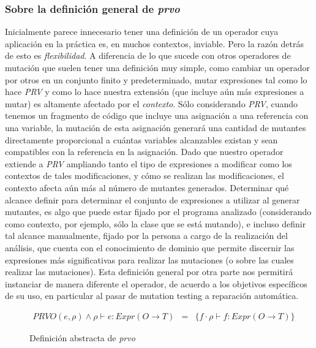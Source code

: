 \subsubsection{Sobre la definici\'on general de \emph{prvo}}
Inicialmente parece innecesario tener una definici\'on de un operador cuya aplicaci\'on en la pr\'actica es, en muchos contextos, inviable. Pero la raz\'on detr\'as de esto es \emph{flexibilidad}. A diferencia de lo que sucede con otros operadores de mutaci\'on que suelen tener una definici\'on muy simple, como cambiar un operador por otros en un conjunto finito y predeterminado, mutar expresiones tal como lo hace \emph{PRV} y como lo hace nuestra extensi\'on (que incluye a\'un m\'as expresiones a mutar) es altamente afectado por el \emph{contexto}. S\'olo considerando \emph{PRV}, cuando tenemos un fragmento de c\'odigo que incluye una asignaci\'on a una referencia con una variable, la mutaci\'on de esta asignaci\'on generar\'a una cantidad de mutantes directamente proporcional a cu\'antas variables alcanzables existan y sean compatibles con la referencia en la asignaci\'on. Dado que nuestro operador extiende a \emph{PRV} ampliando tanto el tipo de expresiones a modificar como los contextos de tales modificaciones, y c\'omo se realizan las modificaciones, el contexto afecta a\'un m\'as al n\'umero de mutantes generados. Determinar qu\'e alcance definir para determinar el conjunto de expresiones a utilizar al generar mutantes, es algo que puede estar fijado por el programa analizado (considerando como contexto, por ejemplo, s\'olo la clase que se est\'a mutando), e incluso definir tal alcance manualmente, fijado por la persona a cargo de la realizaci\'on del an\'alisis, que cuenta con el conocimiento de dominio que permite discernir las expresiones m\'as significativas para realizar las mutaciones (o sobre las cuales realizar las mutaciones). Esta definici\'on general por otra parte nos permitir\'a instanciar de manera diferente el operador, de acuerdo a los objetivos espec\'ificos de su uso, en particular al pasar de mutation testing a reparaci\'on autom\'atica. 

\begin{figure}
	\begin{displaymath}
	\begin{array}{lll}
	PRVO(e, \rho) \wedge \rho \vdash e : Expr(O \rightarrow T) & = & \{f \cdot \rho \vdash f : Expr(O \rightarrow T)\} 
	\end{array}
	\end{displaymath}
	\caption{Definici\'on abstracta de \emph{prvo}}
	\label{figures.definitions.prvo.simple_def}
\end{figure}

